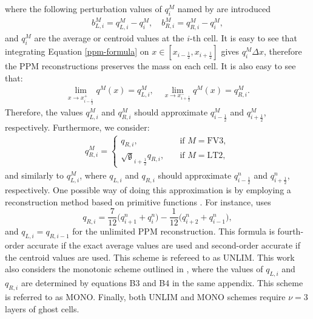 \documentclass[preprint,12pt]{elsarticle}
\begin{document}
\begin{linenumbers}
where the following perturbation values of  ${q_i^M}$ named by \cite{harris:2021} are introduced
\begin{align}
	b_{L,i}^M = q_{L,i}^M-{q_i^M}, \quad 
	b_{R,i}^M = q_{R,i}^M-{q_i^M},
\end{align}
and ${q_i^M}$
are the average or centroid values at the $i$-th cell.
It is easy to see that integrating Equation \eqref{ppm-formula} on $x \in [x_{i-\frac{1}{2}},x_{i+\frac{1}{2}}]$ gives $q^M_i\Delta x$, therefore the PPM reconstructions preserves the mass on each cell. It is also easy to see that:
\begin{align}
	\lim_{x \to x_{i-\frac{1}{2}}^+}{q^M}(x) = q_{L,i}^M,\quad
	\lim_{x \to x_{i+\frac{1}{2}}^-}{q^M}(x) = q_{R,i}^M.
\end{align}
Therefore, the values $q_{L,i}^M$ and $q_{R,i}^M$ should approximate ${q_{i-\frac{1}{2}}^M}$ and ${q_{i+\frac{1}{2}}^M}$, respectively.
Furthermore, we consider:
\begin{align}
	\label{phi_L}
	q_{R,i}^M  =
	\begin{cases}
		q_{R,i},
		\quad &\text{if }{M=\text{FV3}},\\
		\sqrt{\mathfrak{g}}_{i+\frac{1}{2}} q_{R,i},
		\quad &\text{if }{M=\text{LT2}},
	\end{cases}
\end{align}
and similarly to $q_{L,i}^M$, where 
$q_{L,i}$ and $q_{R,i}$ should approximate ${q_{i-\frac{1}{2}}^n}$ and ${q_{i+\frac{1}{2}}^n}$, respectively.
One possible way of doing this approximation is by employing a reconstruction method based on primitive functions \cite[Chapter 17]{leveque:1990}.
For instance, \cite{colella:1984} uses
\begin{equation}
	\label{unlim-ppm}
	q_{R,i} = \frac{7}{12} \bigg( q_{i+1}^n + q_{i}^n \bigg) - \frac{1}{12} \bigg(q_{i+2}^n +q_{i-1}^n\bigg),
\end{equation}
and $q_{L,i}=q_{R,i-1}$ for the unlimited PPM reconstruction.
This formula is fourth-order accurate if the exact average values are used and second-order accurate if the centroid values are used.
This scheme is refereed to as UNLIM.
This work also considers the monotonic scheme outlined in \cite[Appendix B]{lin:2004}, where the values of $q_{L,i}$ and $q_{R,i}$ are determined by equations B3 and B4 in the same appendix.
This scheme is referred to as MONO.
Finally, both UNLIM and MONO schemes require $\nu=3$ layers of ghost cells.


\end{linenumbers}
\end{document}
